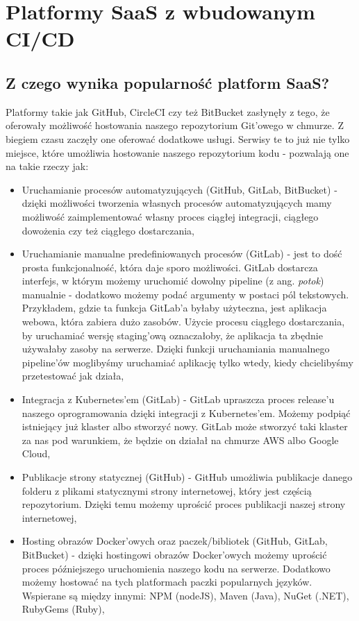 \section{Platformy SaaS z wbudowanym CI/CD}
\subsection{Z czego wynika popularność platform SaaS?}
Platformy takie jak GitHub, CircleCI czy też BitBucket zasłynęły z tego, że oferowały możliwość hostowania naszego repozytorium Git'owego w chmurze. Z biegiem czasu zaczęły one oferować dodatkowe usługi. Serwisy te to już nie tylko miejsce, które umożliwia hostowanie naszego repozytorium kodu - pozwalają one na takie rzeczy jak:
\begin{itemize}
    \item Uruchamianie procesów automatyzujących (GitHub, GitLab, BitBucket) - dzięki możliwości tworzenia własnych procesów automatyzujących mamy możliwość zaimplementować własny proces ciągłej integracji, ciągłego dowożenia czy też ciągłego dostarczania,
    \item Uruchamianie manualne predefiniowanych procesów (GitLab) - jest to dość prosta funkcjonalność, która daje sporo możliwości. GitLab dostarcza interfejs, w którym możemy uruchomić dowolny pipeline (z ang. \textit{potok}) manualnie - dodatkowo możemy podać argumenty w postaci pól tekstowych. Przykładem, gdzie ta funkcja GitLab'a byłaby użyteczna, jest aplikacja webowa, która zabiera dużo zasobów. Użycie procesu ciągłego dostarczania, by uruchamiać wersję staging'ową oznaczałoby, że aplikacja ta zbędnie używałaby zasoby na serwerze. Dzięki funkcji uruchamiania manualnego pipeline'ów moglibyśmy uruchamiać aplikację tylko wtedy, kiedy chcielibyśmy przetestować jak działa,
    \item Integracja z Kubernetes'em (GitLab) - GitLab upraszcza proces release'u naszego oprogramowania dzięki integracji z Kubernetes'em. Możemy podpiąć istniejący już klaster albo stworzyć nowy. GitLab może stworzyć taki klaster za nas pod warunkiem, że będzie on działał na chmurze AWS albo Google Cloud,
    \item Publikacje strony statycznej (GitHub) - GitHub umożliwia publikacje danego folderu z plikami statycznymi strony internetowej, który jest częścią repozytorium. Dzięki temu możemy uprościć proces publikacji naszej strony internetowej,
    \item Hosting obrazów Docker'owych oraz paczek/bibliotek (GitHub, GitLab, BitBucket) - dzięki hostingowi obrazów Docker'owych możemy uprościć proces późniejszego uruchomienia naszego kodu na serwerze. Dodatkowo możemy hostować na tych platformach paczki popularnych języków. Wspierane są między innymi: NPM (nodeJS), Maven (Java), NuGet (.NET), RubyGems (Ruby),

\end{itemize}
